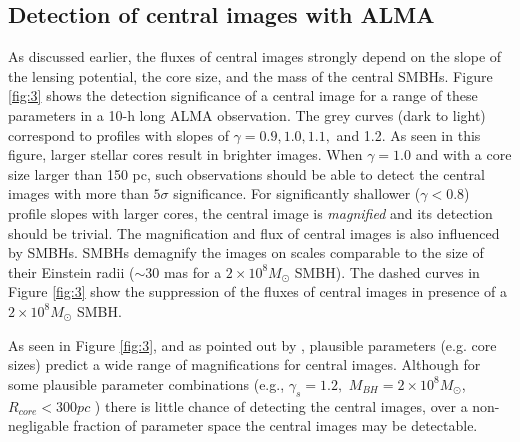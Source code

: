 \documentclass[chicago]{emulateapj}
\newcommand{\red}{\textcolor{red}}
\begin{document}
\subsection{Detection of central images with ALMA}
As discussed earlier, the fluxes of central images strongly depend on the slope of the lensing potential, the core size, and the mass of the central SMBHs.  Figure \ref{fig:3} shows the detection significance of a central image for a range of these parameters in a 10-h long ALMA observation. The grey curves (dark to light) correspond to profiles with slopes of $\gamma=0.9, 1.0, 1.1,$ and 1.2.  As seen in this figure, larger stellar cores result in brighter images. %
When $\gamma=1.0$ and with a core size larger than 150 pc, such observations should be able to detect the central images with more than $5\sigma$ significance. For significantly shallower ($\gamma<0.8$) profile slopes with larger cores, the central image is \emph{magnified} and its detection should be trivial.  The magnification and flux of central images is also influenced by SMBHs.
SMBHs demagnify the images on scales comparable to the size of their Einstein radii ($\sim30$ mas for a $2\times10^8M_{\odot}$ SMBH).
The dashed curves in Figure \ref{fig:3} show the suppression of the fluxes of central images in presence of a $2\times10^8M_{\odot}$ SMBH.

As seen in Figure \ref{fig:3}, and as pointed out by \citet{Keeton:03}, plausible parameters (e.g. core sizes) predict  a wide range of magnifications for   central images. Although for some plausible parameter combinations (e.g., $\gamma_{s}=1.2,$ $M_{BH} = 2\times10^8 M_{\odot}$,$R_{core}<300 pc$ ) there is little chance of detecting the central images, over a non-negligable fraction of parameter space the central images may be detectable. 
\end{document}
